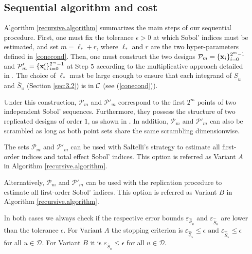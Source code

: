 \subsection{Sequential algorithm and cost}
\label{sec:4.1}

Algorithm \ref{recursive.algorithm} summarizes the main steps of our sequential procedure. First, one must fix the tolerance $\epsilon >0$ at which Sobol' indices must be estimated, and set $m=\ell_*+r$, where $\ell_*$ and $r$ are the two hyper-parameters defined in \eqref{conecond}. Then, one must construct the two designs $\mathcal{P}_{m}=\{\boldsymbol{\mathbf{x}}_i\}_{i=0}^{2^{m}-1}$ and $\mathcal{P}'_{m}=\{\boldsymbol{\mathbf{x}}'_i\}_{i=0}^{2^{m}-1}$ at Step $5$ according to the multiplicative approach detailed in \cite{GJAHMP}. The choice of $\ell_*$ must be large enough to ensure that each integrand of $\underline{S}_u$ and $\overline{S}_u$ (Section \ref{sec:3.2}) is in $\mathcal{C}$ (see  (\ref{conecond})).

Under this construction, $\mathcal{P}_{m}$ and $\mathcal{P}'_{m}$ correspond to the first $2^{m}$ points of two independent Sobol' sequences. Furthermore, they possess the structure of two replicated designs of order $1$, as shown in \cite{GJAHMP}. In addition, $\mathcal{P}_{m}$ and $\mathcal{P}'_{m}$ can also be scrambled as long as both point sets share the same scrambling dimensionwise.
\bigskip

The sets $\mathcal{P}_{m}$ and $\mathcal{P}'_{m}$ can be used with Saltelli's strategy to estimate all first-order indices and total effect Sobol' indices. This option is referred as Variant $A$ in Algorithm \ref{recursive.algorithm}.

Alternatively, $\mathcal{P}_{m}$ and $\mathcal{P}'_{m}$ can be used with the replication procedure to estimate all first-order Sobol' indices. This option is referred as Variant $B$ in Algorithm \ref{recursive.algorithm}. 

In both cases we always check if the respective error bounds $\varepsilon_{\widehat{\underline{S}}_u}$ and $\varepsilon_{\widehat{\overline{S}}_u}$ are lower than the tolerance $\epsilon$. For Variant $A$ the stopping criterion is $\varepsilon_{\widehat{\underline{S}}_u} \leq \epsilon \text{ and } \varepsilon_{\widehat{\overline{S}}_u} \leq \epsilon$ for all $ u \in \mathcal{D}$. For Variant $B$ it is $\varepsilon_{\widehat{\underline{S}}_u} \leq \epsilon$ for all $ u \in \mathcal{D}$. 

